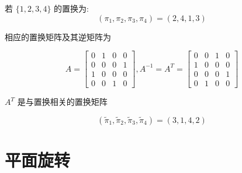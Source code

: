 \begin{example}
    若 $ \{1,2,3,4\} $ 的置换为:
$$
\left(\pi_{1}, \pi_{2}, \pi_{3}, \pi_{4}\right)=(2,4,1,3)
$$

相应的置换矩阵及其逆矩阵为

$$ A=\left[\begin{array}{llll}0 & 1 & 0 & 0 \\ 0 & 0 & 0 & 1 \\ 1 & 0 & 0 & 0 \\ 0 & 0 & 1 & 0\end{array}\right] , A^{-1}=A^{T}=\left[\begin{array}{llll}0 & 0 & 1 & 0 \\ 1 & 0 & 0 & 0 \\ 0 & 0 & 0 & 1 \\ 0 & 1 & 0 & 0\end{array}\right] $$

$ A^{T} $ 是与置换相关的置换矩阵

$$
\left(\tilde{\pi}_{1}, \tilde{\pi}_{2}, \tilde{\pi}_{3}, \tilde{\pi}_{4}\right)=(3,1,4,2)
$$
\end{example}

\section{平面旋转}




